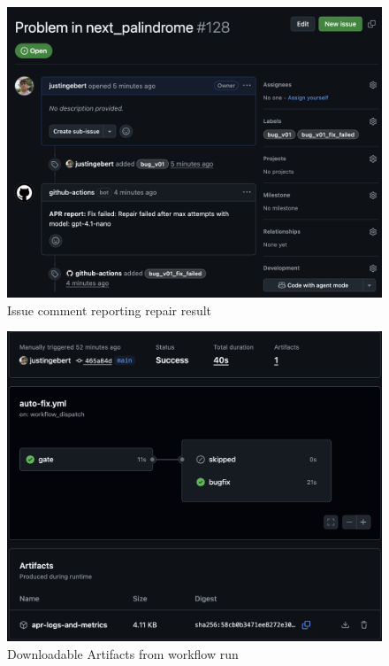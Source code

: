 \begin{figure}[H]
    \centering
    \includegraphics[width=1\textwidth]{images/verification/comment.png}
    \caption{Issue comment reporting repair result}
    \label{fig:comment}
\end{figure}

\begin{figure}[H]
    \centering
    \includegraphics[width=1\textwidth]{images/verification/artifacts.png}
    \caption{Downloadable Artifacts from workflow run}
    \label{fig:logs-artifacts}
\end{figure}


